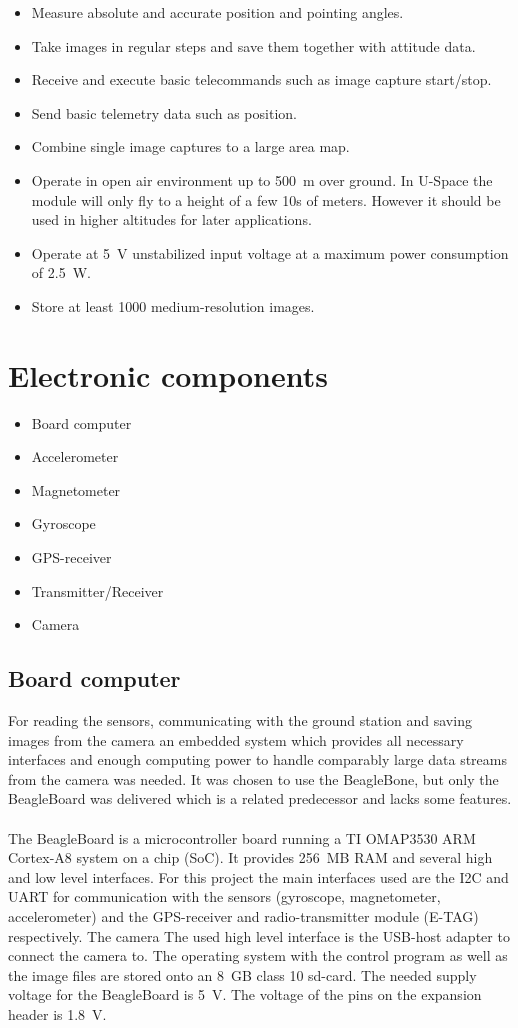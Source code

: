 \begin{itemize}
\item Measure absolute and accurate position and pointing angles.
\item Take images in regular steps and save them together with attitude data.
\item Receive and execute basic telecommands such as image capture start/stop.
\item Send basic telemetry data such as position.
\item Combine single image captures to a large area map.
\item Operate in open air environment up to 500~m over ground. In U-Space the
module will only fly to a height of a few 10s of meters. However it should be
used in higher altitudes for later applications.
\item Operate at 5~V unstabilized input voltage at a maximum power consumption
of 2.5~W.
\item Store at least 1000 medium-resolution images.
\end{itemize}


\section{Electronic components}

\begin{itemize}
 \item Board computer
 \item Accelerometer
 \item Magnetometer
 \item Gyroscope
 \item GPS-receiver
 \item Transmitter/Receiver
 \item Camera
\end{itemize}

\subsection*{Board computer}

For reading the sensors, communicating with the ground station and saving
images from the camera an embedded system which provides all necessary
interfaces and enough computing power to handle comparably large data streams
from the camera was needed. It was chosen to use the BeagleBone, but only the
BeagleBoard was delivered which is a related predecessor and lacks some
features.
\\
\\
The BeagleBoard is a microcontroller board running a TI OMAP3530 ARM Cortex-A8
system on a chip (SoC). It provides 256~MB RAM and several high and low level
interfaces. For this project the main interfaces used are the I2C and UART for
communication with the sensors (gyroscope, magnetometer, accelerometer) and
the GPS-receiver and radio-transmitter module (E-TAG) respectively. The camera
The used high level interface is the USB-host adapter to connect the camera
to. The operating system with the control program as well as the image files
are stored onto an 8~GB class 10 sd-card.
The needed supply voltage for the BeagleBoard is 5~V. The voltage of the pins
on the expansion header is 1.8~V.

